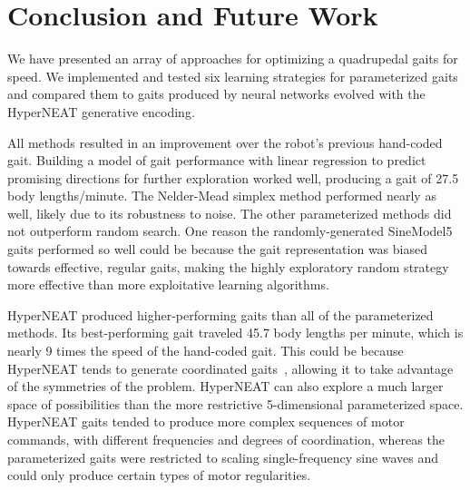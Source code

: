 \section{Conclusion and Future Work}

We have presented an array of approaches for optimizing a quadrupedal
gaits for speed.  We implemented and tested six learning
strategies for parameterized gaits and compared them to gaits produced by neural networks
evolved with the HyperNEAT generative encoding.

All methods resulted in an improvement over the robot's previous
hand-coded gait.  Building a model of gait
performance with linear regression to predict promising directions for further exploration
worked well, producing a gait of 27.5 body
lengths/minute.  The Nelder-Mead simplex method performed nearly as well, likely due to its robustness to noise.  The other parameterized
methods did not outperform random search.  One reason the randomly-generated SineModel5 gaits performed so well could be because the gait representation was biased towards effective, regular gaits, making the highly exploratory random strategy more effective than more exploitative learning algorithms. 

HyperNEAT produced higher-performing gaits than all of the parameterized
methods. Its best-performing gait traveled 45.7 body lengths per minute, which is nearly 9 times the speed of the hand-coded gait.  This could be because HyperNEAT tends to generate coordinated gaits~\citep{clune2011performance, clune2009evolving}, allowing it to
take advantage of the symmetries of the problem. HyperNEAT can also explore a much larger space of possibilities than the
more restrictive 5-dimensional parameterized space.  HyperNEAT gaits tended to produce more complex sequences of motor commands, with different frequencies and degrees of coordination, whereas the
parameterized gaits were restricted to scaling single-frequency sine waves and could only produce certain types of motor regularities. 
